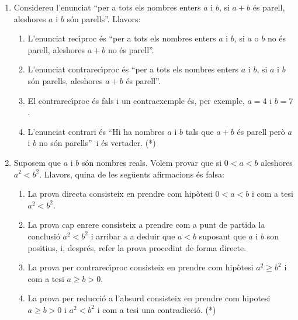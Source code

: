 

\begin{enumerate}
\item Considereu l'enunciat \textquotedblleft per a tots els nombres enters
$a$ i $b$, si $a+b$ \'{e}s parell, aleshores $a$ i $b$ s\'{o}n
parells\textquotedblright. Llavors:

\begin{enumerate}
\item L'enunciat rec\'{\i}proc \'{e}s \textquotedblleft per a tots els nombres
enters $a$ i $b$, si $a$ o $b$ no \'{e}s parell, aleshores $a+b$ no \'{e}s
parell\textquotedblright.

\item L'enunciat contrarec\'{\i}proc \'{e}s \textquotedblleft per a tots els
nombres enters $a$ i $b$, si $a$ i $b$ s\'{o}n parells, aleshores $a+b$ \'{e}s
parell\textquotedblright.

\item El contrarec\'{\i}proc \'{e}s fals i un contraexemple \'{e}s, per
exemple, $a=4$ i $b=7$.

\item L'enunciat contrari \'{e}s \textquotedblleft Hi ha nombres $a$ i $b$
tals que $a+b$ \'{e}s parell per\`{o} $a$ i $b$ no s\'{o}n
parells\textquotedblright\ i \'{e}s vertader. (*)
\end{enumerate}

\item Suposem que $a$ i $b$ s\'{o}n nombres reals. Volem provar que si $0<a<b
$ aleshores $a^{2}<b^{2}$. Llavors, quina de les seg\"{u}ents afirmacions
\'{e}s falsa:

\begin{enumerate}
\item La prova directa consisteix en prendre com hip\`{o}tesi $0<a<b$ i com a
tesi $a^{2}<b^{2}$.

\item La prova cap enrere consisteix a prendre com a punt de partida la
conclusi\'{o} $a^{2}<b^{2}$ i arribar a a deduir que $a<b$ suposant que $a$ i
$b$ son positius, i, despr\'{e}s, refer la prova procedint de forma directe.

\item La prova per contrarec\'{\i}proc consisteix en prendre com hip\`{o}tesi
$a^{2}\geq b^{2}$ i com a tesi $a\geq b>0$.

\item La prova per reducci\'{o} a l'absurd consisteix en prendre com hipotesi
$a\geq b>0$ i $a^{2}<b^{2}$ i com a tesi una contradicci\'{o}. (*)
\end{enumerate}


\end{enumerate}
